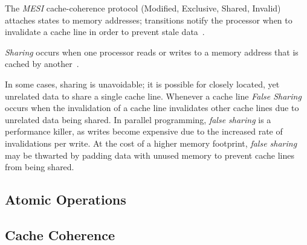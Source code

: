 The \emph{MESI} cache-coherence protocol (Modified, Exclusive, Shared, Invalid)
attaches states to memory addresses; transitions notify the processor
when to invalidate a cache line in order to prevent stale data~\cite[Appendix~B.5.1]{herlihy2020art}.

\emph{Sharing} occurs when one processor reads or writes to a memory address that
is cached by another~\cite[Appendix~B.5.1]{herlihy2020art}.

In some cases, sharing is unavoidable; it is possible for closely located,
yet unrelated data to share a single cache line. Whenever a cache line
\emph{False Sharing} occurs when the invalidation of a cache line invalidates
other cache lines due to unrelated data being shared. In parallel programming,
\emph{false sharing} is a performance killer, as writes become expensive due to
the increased rate of invalidations per write. At the cost of a higher memory
footprint, \emph{false sharing} may be thwarted by padding data with
unused memory to prevent cache lines from being shared.





\subsection{Atomic Operations}

\subsection{Cache Coherence}

